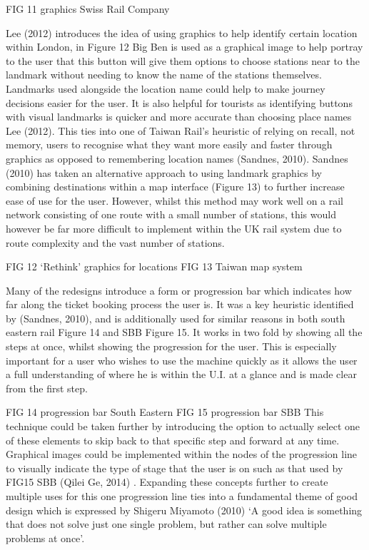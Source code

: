 FIG 11 graphics Swiss Rail Company


Lee (2012) introduces the idea of using graphics to help identify certain location within London, in Figure 12 Big Ben is used as a graphical image to help portray to the user that this button will give them options to choose stations near to the landmark without needing to know the name of the stations themselves. Landmarks used alongside the location name could help to make journey decisions easier for the user. It is also helpful for tourists as identifying buttons with visual landmarks is quicker and more accurate than choosing place names Lee (2012). This ties into one of Taiwan Rail’s heuristic of relying on recall, not memory, users to recognise what they want more easily and faster through graphics as opposed to remembering location names (Sandnes, 2010). Sandnes (2010) has taken an alternative approach to using landmark graphics by combining destinations within a map interface (Figure 13) to further increase ease of use for the user. However, whilst this method may work well on a rail network consisting of one route with a small number of stations, this would however be far more difficult to implement within the UK rail system due to route complexity and the vast number of stations.


FIG 12 ‘Rethink’ graphics for locations		FIG 13 Taiwan map system


Many of the redesigns introduce a form or progression bar which indicates how far along the ticket booking process the user is. It was a key heuristic identified by (Sandnes, 2010), and is additionally used for similar reasons in both south eastern rail Figure 14 and SBB Figure 15. It works in two fold by showing all the steps at once, whilst showing the progression for the user. This is especially important for a user who wishes to use the machine quickly as it allows the user a full understanding of where he is within the U.I. at a glance and is made clear from the first step.


FIG 14 progression bar South Eastern	FIG 15 progression bar SBB		
This technique could be taken further by introducing the option to actually select one of these elements to skip back to that specific step and forward at any time. Graphical images could be implemented within the nodes of the progression line to visually indicate the type of stage that the user is on such as that used by FIG15 SBB (Qilei Ge, 2014) . Expanding these concepts further to create multiple uses for this one progression line ties into a fundamental theme of good design which is expressed by Shigeru Miyamoto (2010) ‘A good idea is something that does not solve just one single problem, but rather can solve multiple problems at once’.



